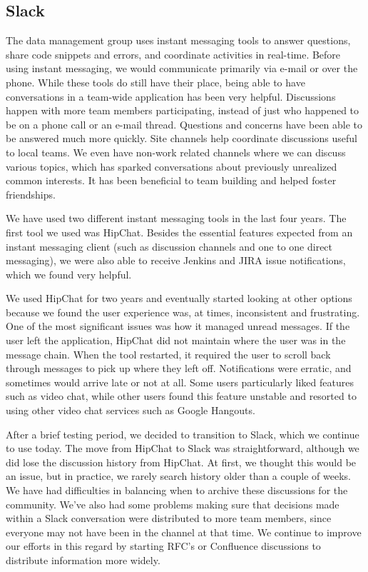\subsection{Slack}

The data management group uses instant messaging tools to answer questions, 
share code snippets and errors, and coordinate activities in real-time.  
Before using instant messaging, we would communicate primarily via e-mail or 
over the phone. While these tools do still have their place, being able to have 
conversations in a team-wide application has been very helpful. Discussions
happen with more team members participating, instead of just who happened to
be on a phone call or an e-mail thread. Questions and concerns have been able
to be answered much more quickly.  Site channels help coordinate discussions
useful to local teams.  We even have non-work related channels where we can
discuss various topics, which has sparked conversations about previously
unrealized common interests. It has been beneficial to team building and 
helped foster friendships.

We have used two different instant messaging tools in the last four years. The
first tool we used was HipChat. Besides the essential features expected
from an instant messaging client (such as discussion channels and one
to one direct messaging), we were also able to receive Jenkins and JIRA issue
notifications, which we found very helpful.

We used HipChat for two years and eventually started looking at other options 
because we found the user experience was, at times, inconsistent and 
frustrating. One of the most significant issues was how it managed unread
messages. If the user left the application, HipChat did not maintain where the
user was in the message chain. When the tool restarted, it required the user
to scroll back through messages to pick up where they left off. Notifications
were erratic, and sometimes would arrive late or not at all. Some users
particularly liked features such as video chat, while other users found this
feature unstable and resorted to using other video chat services such as Google 
Hangouts. 

After a brief testing period, we decided to transition to Slack, which we
continue to use today. The move from HipChat to Slack was straightforward,
although we did lose the discussion history from HipChat.  At first, we 
thought this would be an issue, but in practice, we rarely search history older
than a couple of weeks.  We have had difficulties in balancing when to 
archive these discussions for the community.  We've also had some problems
making sure that decisions made within a Slack conversation were
distributed to more team members, since everyone may not have been in the 
channel at that time.  We continue to improve our efforts in this regard by 
starting RFC's or Confluence discussions to distribute information more widely.

